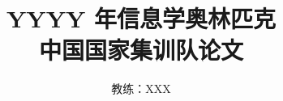 \documentclass{article}
\begin{document}
{
	\title{YYYY 年信息学奥林匹克 \\ 中国国家集训队论文}
	\author{教练：XXX}
	\maketitle
	\thispagestyle{empty}
}
{
	\newpage
	\hypersetup{hidelinks}
	\setcounter{tocdepth}{1}
	\tableofcontents
	\thispagestyle{empty}
}

\setcounter{page}{0}

\end{document}
